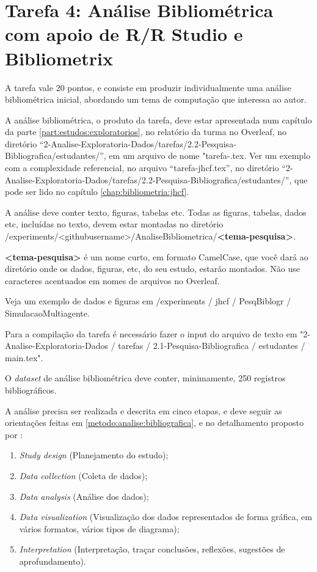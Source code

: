 \section{Tarefa 4: Análise Bibliométrica com apoio de R/R Studio e Bibliometrix}

A tarefa vale 20 pontos, e consiste em produzir individualmente uma análise bibliométrica inicial, abordando um tema de computação que  interessa ao autor. 

A análise bibliométrica, o produto da tarefa, deve estar apresentada num capítulo da parte \ref{part:estudos:exploratorios}, no relatório da turma no Overleaf, no diretório ``2-Analise-Exploratoria-Dados/tarefas/2.2-Pesquisa-Bibliografica/estudantes/'', em um arquivo de nome "tarefa-\githubusername.tex. Ver um exemplo com a complexidade referencial, no arquivo ``tarefa-jhcf.tex'', no diretório ``2-Analise-Exploratoria-Dados/tarefas/2.2-Pesquisa-Bibliografica/estudantes/'', que pode ser lido no capítulo \ref{chap:bibliometria:jhcf}. 

A análise deve conter texto, figuras, tabelas  etc. Todas as figuras, tabelas, dados etc, incluídas no texto, devem estar montadas no diretório /experiments/<githubusername>/AnaliseBibliometrica/\textbf{<tema-pesquisa>}. 

\textbf{<tema-pesquisa>} é um nome curto, em formato CamelCase, que você dará ao diretório onde os dados, figuras, etc, do seu estudo, estarão montados. Não use caracteres acentuados em nomes de arquivos no Overleaf.

Veja um exemplo de dados e figuras em 
/experiments / jhcf / PesqBiblogr / SimulacaoMultiagente.


Para a compilação da tarefa é necessário fazer o input do arquivo de texto em "2-Analise-Exploratoria-Dados / tarefas / 2.1-Pesquisa-Bibliografica / estudantes / main.tex".

O \textit{dataset} de análise bibliométrica deve conter, minimamente, 250 registros bibliográficos.


A análise precisa ser realizada e descrita em cinco etapas, e deve seguir as orientações feitas em \ref{metodo:analise:bibliografica}, e no detalhamento proposto por \citet{aria_bibliometrix_2017}:
\begin{enumerate}
    \item \textit{Study design} (Planejamento do estudo);

    \item  \textit{Data collection} (Coleta de dados);

    \item \textit{Data analysis} (Análise dos dados);

    \item \textit{Data visualization} (Visualização dos dados representados de forma gráfica, em vários formatos, vários tipos de diagrama);

    \item  \textit{Interpretation} (Interpretação, traçar conclusões, reflexões, sugestões de aprofundamento).
\end{enumerate}

